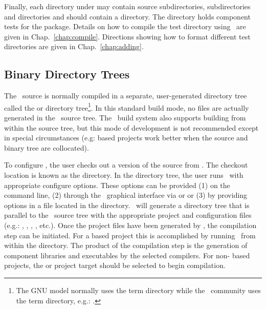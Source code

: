 Finally, each directory under  may contain source
subdirectories,  subdirectories and  directories and should contain a  directory.  The
 directory holds component tests for the package.  Details
on how to compile the test directory using \ctest\ are given
in Chap.~\ref{chap:compile}.  Directions showing how to format
different test directories are given in Chap.~\ref{chap:adding}.

\subsection{Binary Directory Trees}

The \draco\ source is normally compiled in a separate, user-generated directory
tree called the  or  directory tree\footnote{The GNU model normally uses the term  directory while the \cmake\ community uses the term  directory, e.g.: .}.     In this standard build mode, no files are
actually generated in the \draco\ source tree.  The \draco\ build system also supports building from within the source tree, but this mode of development is not recommended except in special circumstances (e.g:  based projects work better when the source and binary tree are collocated). 

To configure \draco,
the user checks out a version of the source from \svn.  The checkout location is known as the  directory.  In the  directory tree, the user runs \cmake\ with appropriate configure options.  These options can be provided (1) on the command line, (2) through the \cmake\ graphical interface via   or   or (3) by providing options in a   file located in the  directory.  \cmake\ will generate a directory tree
that is parallel to the \draco\ source tree with the appropriate
project and configuration files (e.g.: , , , , etc.).  Once the project files have been generated by \cmake, the compilation step can be initiated.  For a  based project this is accomplished by running \gmake\ from within the  directory.  The product of the compilation step is the generation of component libraries and executables by the selected compilers.  For non- based projects, the  or  project target should be selected to begin compilation.

